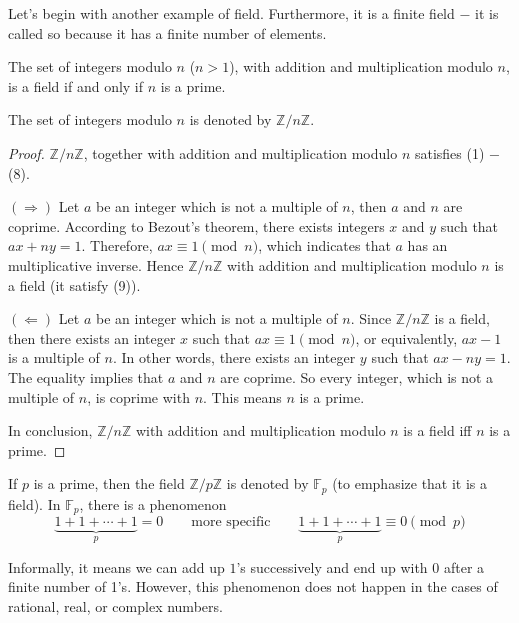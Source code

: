 Let's begin with another example of field. Furthermore, it is a finite field $-$ it is called so because it has a finite number of elements.

\begin{theorem}
    The set of integers modulo $n$ ($n > 1$), with addition and multiplication modulo $n$, is a field if and only if $n$ is a prime.
\end{theorem}

The set of integers modulo $n$ is denoted by $\mathbb{Z}/n\mathbb{Z}$.

\begin{proof}
    $\mathbb{Z}/n\mathbb{Z}$, together with addition and multiplication modulo $n$ satisfies (1) $-$ (8).

    $(\Rightarrow)$ Let $a$ be an integer which is not a multiple of $n$, then $a$ and $n$ are coprime. According to Bezout's theorem, there exists integers $x$ and $y$ such that $ax + ny = 1$. Therefore, $ax\equiv 1\pmod{n}$, which indicates that $a$ has an multiplicative inverse. Hence $\mathbb{Z}/n\mathbb{Z}$ with addition and multiplication modulo $n$ is a field (it satisfy (9)).

    $(\Leftarrow)$ Let $a$ be an integer which is not a multiple of $n$. Since $\mathbb{Z}/n\mathbb{Z}$ is a field, then there exists an integer $x$ such that $ax\equiv 1\pmod{n}$, or equivalently, $ax - 1$ is a multiple of $n$. In other words, there exists an integer $y$ such that $ax - ny = 1$. The equality implies that $a$ and $n$ are coprime. So every integer, which is not a multiple of $n$, is coprime with $n$. This means $n$ is a prime.

    In conclusion, $\mathbb{Z}/n\mathbb{Z}$ with addition and multiplication modulo $n$ is a field iff $n$ is a prime.
\end{proof}

If $p$ is a prime, then the field $\mathbb{Z}/p\mathbb{Z}$ is denoted by $\mathbb{F}_{p}$ (to emphasize that it is a field). In $\mathbb{F}_{p}$, there is a phenomenon
\[
    \underbrace{1 + 1 + \cdots + 1}_{p} = 0 \qquad \text{more specific}\qquad \underbrace{1 + 1 + \cdots + 1}_{p} \equiv 0\pmod{p}
\]

Informally, it means we can add up $1$'s successively and end up with $0$ after a finite number of 1's. However, this phenomenon does not happen in the cases of rational, real, or complex numbers.

\begin{definition}
\end{definition}

